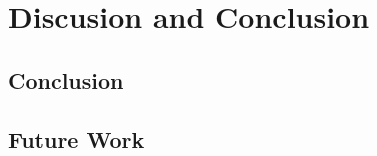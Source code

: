 \chapter{Discusion and Conclusion}


\section{  Conclusion}
\label{sec:ConclusionConclusion }

\section{Future Work}
\label{sec:FutureWork}


